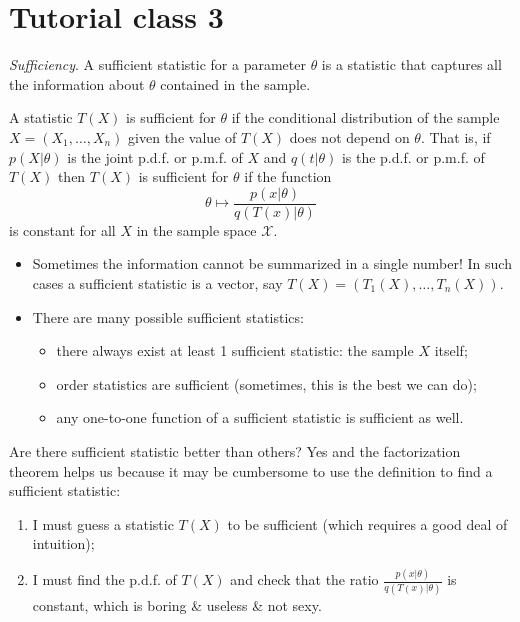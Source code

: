 \section{Tutorial class 3}
\begin{revise}
	\emph{Sufficiency}. A sufficient statistic for a parameter $\theta$ is a statistic that captures all the information about $\theta$ contained in the sample.
	\begin{definition}
		A statistic $T(X)$ is sufficient for $\theta$ if the conditional distribution of the sample $X=(X_{1},\ldots,X_{n})$ given the value of $T(X)$ does not depend on $\theta$. That is, if $p(X|\theta)$ is the joint p.d.f. or p.m.f. of $X$ and $q(t|\theta)$ is the p.d.f. or p.m.f. of $T(X)$ then $T(X)$ is sufficient for $\theta$ if the function
		\begin{equation*}
			\theta\mapsto\frac{p(x|\theta)}{q(T(x)|\theta)}
		\end{equation*}
		is constant for all $X$ in the sample space $\mathcal{X}$.
	\end{definition}
	\begin{remark}
		\begin{itemize}
			\item Sometimes the information cannot be summarized in a single number! In such cases a sufficient statistic is a vector, say $T(X)=(T_{1}(X),\ldots,T_{n}(X))$.
			\item There are many possible sufficient statistics:
			\begin{itemize}
				\item there always exist at least 1 sufficient statistic: the sample $X$ itself;
				\item order statistics are sufficient (sometimes, this is the best we can do);
				\item any one-to-one function of a sufficient statistic is sufficient as well.
			\end{itemize}
		\end{itemize}
	\end{remark}
	Are there sufficient statistic better than others? Yes and the factorization theorem helps us because it may be cumbersome to use the definition to find a sufficient statistic:
	\begin{enumerate}
		\item I must guess a statistic $T(X)$ to be sufficient (which requires a good deal of intuition);
		\item I must find the p.d.f. of $T(X)$ and check that the ratio $\frac{p(x|\theta)}{q(T(x)|\theta)}$ is constant, which is boring \& useless \& not sexy.

\end{enumerate}
\end{revise}
